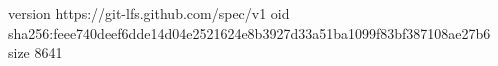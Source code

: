 version https://git-lfs.github.com/spec/v1
oid sha256:feee740deef6dde14d04e2521624e8b3927d33a51ba1099f83bf387108ae27b6
size 8641

